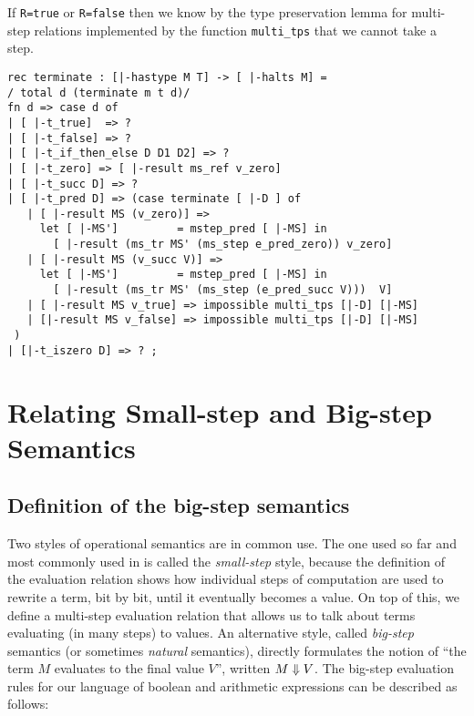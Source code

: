 If \lstinline!R=true! or \lstinline!R=false! then we know by the type
preservation lemma for multi-step relations implemented by the
function \lstinline!multi_tps! that we cannot take a step.



\begin{lstlisting}
rec terminate : [|-hastype M T] -> [ |-halts M] =
/ total d (terminate m t d)/
fn d => case d of
| [ |-t_true]  => ?
| [ |-t_false] => ?
| [ |-t_if_then_else D D1 D2] => ?
| [ |-t_zero] => [ |-result ms_ref v_zero]
| [ |-t_succ D] => ?
| [ |-t_pred D] => (case terminate [ |-D ] of
   | [ |-result MS (v_zero)] =>
     let [ |-MS']         = mstep_pred [ |-MS] in
       [ |-result (ms_tr MS' (ms_step e_pred_zero)) v_zero]
   | [ |-result MS (v_succ V)] =>
     let [ |-MS']         = mstep_pred [ |-MS] in
       [ |-result (ms_tr MS' (ms_step (e_pred_succ V)))  V]
   | [ |-result MS v_true] => impossible multi_tps [|-D] [|-MS]
   | [|-result MS v_false] => impossible multi_tps [|-D] [|-MS]
 )
| [|-t_iszero D] => ? ;
\end{lstlisting}


\section{Relating Small-step and Big-step Semantics}
\label{sec:small-to-big}
\subsection{Definition of the big-step semantics}

Two styles of operational semantics are in common use. The one used so far and
most commonly used in \cite{TAPL} is called the {\em small-step} style, because
the definition of the evaluation relation shows how individual steps of
computation are used to rewrite a term, bit by bit, until it eventually becomes
a value. On top of this, we define a multi-step evaluation relation that allows
us to talk about terms evaluating (in many steps) to values. An alternative
style, called {\em big-step} semantics (or sometimes {\em natural} semantics),
directly formulates the notion of ``the term $M$ evaluates to the final value $V$'',
written $M \Downarrow V$. The big-step evaluation rules for our language of
boolean and arithmetic expressions can be described as follows:

